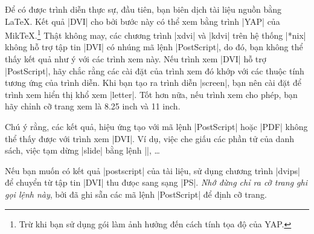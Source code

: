 Để có được trình diễn thực sự, đầu tiên, bạn biên dịch tài liệu nguồn
bằng \LaTeX. Kết quả |DVI| cho bởi bước này có thể xem bằng trình |YAP|
của Mik\TeX.\footnote{Trừ khi bạn sử dụng gói  làm ảnh
hưởng đến cách tính tọa độ của YAP.} Thật không may, các chương trình |xdvi|
và |kdvi| trên hệ thống |*nix| không hỗ trợ tập tin |DVI| có nhúng mã
lệnh |PostScript|, do đó, bạn không thể thấy kết quả như ý với các trình xem này.
Nếu trình xem |DVI| hỗ trợ |PostScript|, hãy chắc rằng các cài đặt của trình xem
đó khớp với các thuộc tính tương ứng của trình diễn. Khi bạn tạo ra trình diễn
|screen|, bạn nên cài đặt để trình xem hiển thị khổ xem |letter|.
Tốt hơn nữa, nếu trình xem cho phép, bạn hãy chỉnh cỡ trang xem là 8.25 inch
và 11 inch.

Chú ý rằng, các kết quả, hiệu ứng tạo với mã lệnh |PostScript| hoặc |PDF|
không thể thấy được với trình xem |DVI|. Ví dụ, việc che giấu các phần
tử của danh sách, việc tạm dừng |slide| bằng lệnh |\pause|, \ldots

Nếu bạn muốn có kết quả |postscript| của tài liệu, sử dụng chương trình 
|dvips| để chuyển từ tập tin |DVI| thu đưọc sang sạng |PS|. \emph{Nhớ
đừng chỉ ra cỡ trang ghi gọi lệnh này}, bởi  đã ghi sẵn các
mã lệnh |PostScript| để định cỡ trang.%

